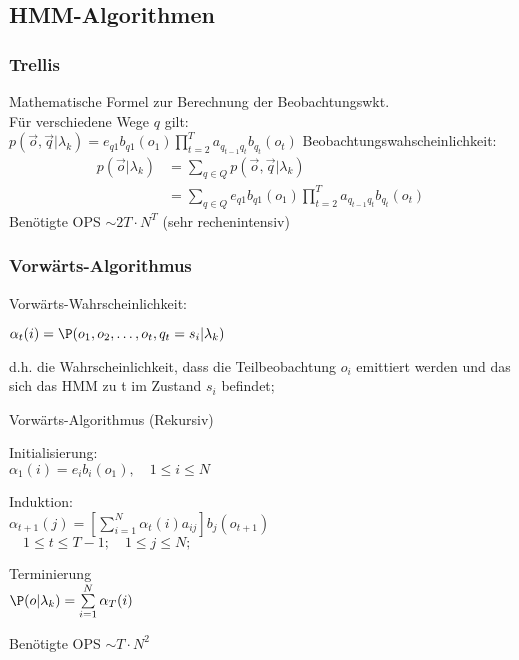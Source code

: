\documentclass[german,color,6pt]{latex4ei/latex4ei_sheet}
\begin{document}
\begin{sectionbox}
	\subsection{HMM-Algorithmen}

	\subsubsection{Trellis}
	Mathematische Formel zur Berechnung der Beobachtungswkt.\\
	Für verschiedene Wege $q$ gilt: \\
	$p(\vec o, \vec q | \lambda_k) = e_{q1} b_{q1} (o_1) \prod\limits^T _{t=2} a_{q_{t-1} q_t} b_{q_t} (o_t)$
	Beobachtungswahscheinlichkeit:
	\begin{equation*}
	\begin{aligned}
		p(\vec o | \lambda_k) &= \sum\limits_{q \in Q} p(\vec o, \vec q | \lambda_k) \\
		&= \sum\limits_{q \in Q} e_{q1} b_{q1} (o_1) \prod\limits^T _{t=2} a_{q_{t-1} q_t} b_{q_t} (o_t)
	\end{aligned}
	\end{equation*}
	Benötigte OPS $\sim 2T \cdot N^T$ (sehr rechenintensiv)\\

	\subsubsection{Vorwärts-Algorithmus}
	Vorwärts-Wahrscheinlichkeit:

	$\alpha_t (i) = \P(o_1, o_2, \dots , o_t , q_t = s_i | \lambda_k)$

	d.h. die Wahrscheinlichkeit, dass die Teilbeobachtung $o_i$ emittiert werden und das sich das HMM zu t im Zustand $s_i$ befindet;

	\begin{cookbox}{Vorwärts-Algorithmus (Rekursiv)}
		\item Initialisierung: \\
			$\alpha_1(i) = e_i b_i (o_1), \quad 1 \leq i \leq N $\\
		\item Induktion: \\
			$ \alpha_{t+1} (j) = \left[ \sum\limits_{i=1}^N{\alpha_t (i) a_{ij}} \right] b_j (o_{t+1}) $\\
			$  \quad 1 \leq t \leq T-1; \quad 1 \leq j \leq N;$\\
		\item Terminierung \\
			$\P(o|\lambda_k )= \sum\limits_{i=1}^N \alpha _T (i)$\\
	\end{cookbox}
	Benötigte OPS $\sim T \cdot N^2$
\end{sectionbox}
\end{document}
